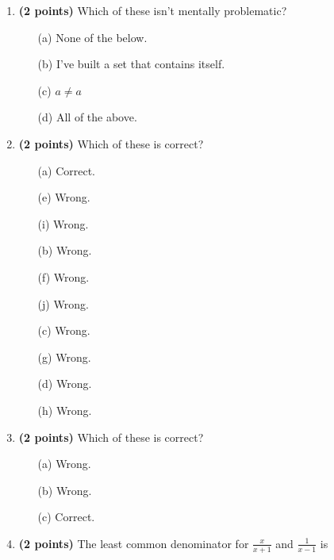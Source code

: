 \documentclass[12pt]{amsart}
\begin{document}
\newpage
\begin{enumerate}
\item {\bf (2 points)} 
 Which of these isn't mentally problematic?

\begin{minipage}[t]{1.0\linewidth}\begin{itemize}\item[(a)]  None of the below.  \item[(b)]  I've built a set that contains itself. \item[(c)]  $a \neq a$ \item[(d)]   All of the above. \end{itemize}\end{minipage} \vfill 
\item {\bf (2 points)} 
 Which of these is correct?

\begin{minipage}[t]{1.0\linewidth}\begin{multicols}{4}\begin{itemize}\item[(a)]  Correct. \item[(e)]  Wrong. \item[(i)]  Wrong. \item[(b)]  Wrong. \item[(f)]  Wrong. \item[(j)]  Wrong. \item[(c)]  Wrong. \item[(g)]  Wrong. \item[] \item[(d)]  Wrong. \item[(h)]  Wrong. \item[] \end{itemize}\end{multicols}\end{minipage} \vfill 
\item {\bf (2 points)} 
 Which of these is correct?

\begin{minipage}[t]{1.0\linewidth}\begin{multicols}{3}\begin{itemize}\item[(a)]  Wrong. \item[(b)]  Wrong. \item[(c)]  Correct. \end{itemize}\end{multicols}\end{minipage} \vfill 
\item {\bf (2 points)} 
 The least common denominator for $\displaystyle \frac{x}{x+1}$ and $\displaystyle \frac{1}{x-1}$ is \vspace{.2cm}


\end{enumerate}
\end{document}
